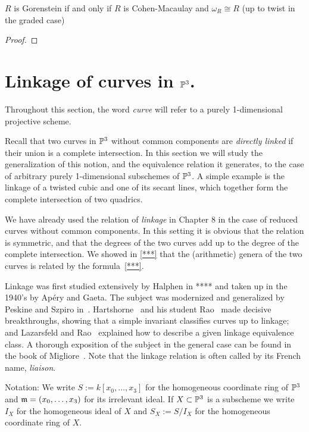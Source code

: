 \begin{theorem} \label{canonical of Gor}
 $R$ is Gorenstein if and only if $R$ is Cohen-Macaulay and $\omega_{R} \cong R$ (up to twist in the graded case)
\end{theorem}
\begin{proof}
 
\end{proof}

\section{Linkage of curves in $\PP^3$.}

Throughout this section, the word \emph{curve} will refer to a purely 1-dimensional projective scheme.

Recall that two curves in $\PP^3$ without common components are \emph{directly linked} if their union is a complete intersection. In this section we will study the generalization of this notion, and the equivalence relation it generates, to the case of arbitrary purely 1-dimensional subschemes of $\PP^3$. A simple example is the linkage of a twisted cubic and one of its secant lines, which together form the complete intersection of two quadrics.

We have already used the relation of \emph{ linkage} in Chapter 8  in the case of reduced curves without common components. In this setting it is obvious that the relation is symmetric, and that the degrees of the two curves add up to the degree of the complete intersection. We showed in \ref{***} that the (arithmetic) genera of the two curves is related by the formula~\ref{***}. 

Linkage was first studied extensively by Halphen in **** and taken up in the 1940's by Ap\'ery and Gaeta. The subject was modernized and generalized by Peskine and Szpiro in~\cite{PeskineSzpiro}. Hartshorne~\cite{} and his student
Rao~\cite{} made decisive breakthroughs, showing that a simple invariant classifies curves up to linkage; and Lazarsfeld and Rao~\cite{} explained how to describe a given linkage equivalence class. A thorough exposition of the subject in the general case can be found in the book of Migliore~\cite{Mig}. Note that the linkage relation is often called by its French name, \emph{liaison}.

Notation:  We write $S := k[x_0,\dots,x_3]$ for the homogeneous coordinate ring of $\PP^3$ and $\gm = (x_0,\dots,x_3)$ for its
irrelevant ideal. If $X\subset \PP^3$ is a subscheme we write $I_X$ for the homogeneous ideal of $X$ and $S_X:=S/I_X$ for the homogeneous coordinate ring of $X$. 

